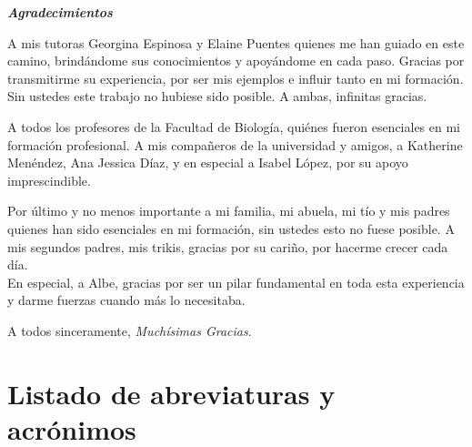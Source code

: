 {\it{\bf \Huge Agradecimientos }}

\vspace{1.3cm}


\medskip
\medskip
\medskip

A mis tutoras Georgina Espinosa y Elaine Puentes quienes me han guiado en este camino, brind\'andome sus conocimientos y apoy\'andome en cada paso. Gracias por transmitirme su experiencia, por ser mis ejemplos e influir tanto en mi formaci\'on. Sin ustedes este trabajo no hubiese sido posible. A ambas, infinitas gracias. 

\medskip
\medskip
\medskip

A todos los profesores de la Facultad de Biología, quiénes fueron esenciales en mi formaci\'on profesional. A mis compañeros de la universidad y amigos, a Katherine Men\'endez, Ana Jessica D\'iaz, y en especial a Isabel L\'opez, por su apoyo imprescindible. 

\medskip
\medskip
\medskip

Por último y no menos importante a mi familia, mi abuela, mi t\'io y mis padres quienes han sido esenciales en mi formaci\'on, sin ustedes esto no fuese posible. A mis segundos padres, mis trikis, gracias por su cari\~no, por hacerme crecer cada d\'ia. \\

En especial, a Albe, gracias por ser un pilar fundamental en toda esta experiencia y darme fuerzas cuando m\'as lo necesitaba. 






\medskip
\medskip
\medskip
\medskip
\medskip
\medskip
\medskip
\medskip
\medskip
\medskip
\medskip
\medskip
\medskip
\medskip
\medskip
\begin{flushright}
A todos sinceramente, \emph{Muchísimas Gracias}. 
\end{flushright}
\clearpage
\section*{Listado de abreviaturas y acrónimos}

